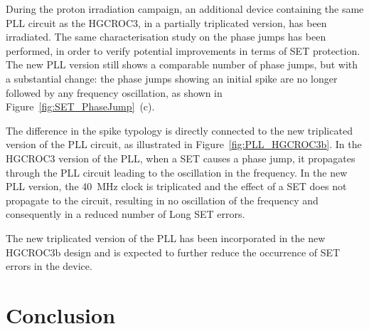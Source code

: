 \bigbreak

During the proton irradiation campaign, an additional device containing the same PLL circuit as the HGCROC3, in a partially triplicated version, has been irradiated.
The same characterisation study on the phase jumps has been performed, in order to verify potential improvements in terms of SET protection.
The new PLL version still shows a comparable number of phase jumps, but with a substantial change: the phase jumps showing an initial spike are no longer followed by any frequency oscillation, as shown in Figure~\ref{fig:SET_PhaseJump}~(c).

The difference in the spike typology is directly connected to the new triplicated version of the PLL circuit, as illustrated in Figure~\ref{fig:PLL_HGCROC3b}.
In the HGCROC3 version of the PLL, when a SET causes a phase jump, it propagates through the PLL circuit leading to the oscillation in the frequency.
In the new PLL version, the 40~MHz clock is triplicated and the effect of a SET does not propagate to the circuit, resulting in no oscillation of the frequency and consequently in a reduced number of Long SET errors.

The new triplicated version of the PLL has been incorporated in the new HGCROC3b design and is expected to further reduce the occurrence of SET errors in the device.

\section{Conclusion}

